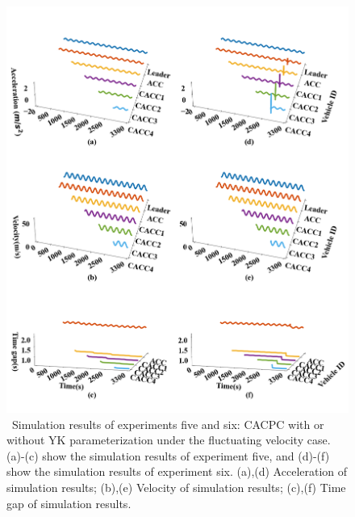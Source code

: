 \documentclass[trsc,nonblindrev]{informs3} %
\begin{document}
\begin{figure}
    \centering
    \includegraphics[width=14cm]{figs/f_YK_form.png}
    \caption{~Simulation results of experiments five and six: CACPC with or without YK parameterization under the fluctuating velocity case. (a)-(c) show the simulation results of experiment five, and (d)-(f) show the simulation results of experiment six. (a),(d) Acceleration of simulation results; (b),(e) Velocity of simulation results; (c),(f) Time gap of simulation results.}
    \label{new5}
\end{figure}
\end{document}
